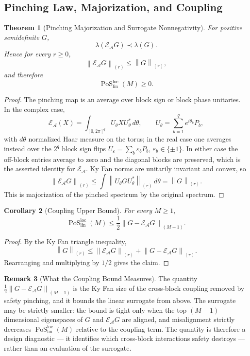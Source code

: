 \documentclass[12pt]{article}
\newtheorem{theorem}{Theorem}[section]
\newtheorem{corollary}[theorem]{Corollary}
\theoremstyle{definition}
\newtheorem{remark}[theorem]{Remark}
\DeclareMathOperator{\PoS}{PoS}
\newcommand{\EA}{\mathcal E_{\mathcal A}}
\newcommand{\KyF}[2]{\left\|#1\right\|_{(#2)}}
\newcommand{\PoSlin}{\PoS_{\mathrm{lin}}^{\mathrm{loc}}}
\begin{document}
\subsection{Pinching Law, Majorization, and Coupling}
\label{subsec:pos-pinching}

\begin{theorem}[Pinching Majorization and Surrogate Nonnegativity]
\label{thm:pinching}
For positive semidefinite $G$,
\[
\lambda(\EA G)\prec\lambda(G).
\]
Hence for every $r\ge0$,
\[
\KyF{\EA G}{r}
\le
\KyF{G}{r},
\]
and therefore
\[
\PoSlin(M)\ge0.
\]
\end{theorem}

\begin{proof}
The pinching map is an average over block sign or block phase unitaries.  In
the complex case,
\[
\EA(X)
=
\int_{[0,2\pi]^q}
U_\theta XU_\theta^{*}\,d\theta,
\qquad
U_\theta=\sum_{b=1}^q e^{i\theta_b}P_b,
\]
with $d\theta$ normalized Haar measure on the torus; in the real case one
averages instead over the $2^q$ block sign flips
$U_\varepsilon=\sum_b\varepsilon_bP_b$, $\varepsilon_b\in\{\pm1\}$.  In either
case the off-block entries average to zero and the diagonal blocks are
preserved, which is the asserted identity for $\EA$.  Ky Fan norms are
unitarily invariant and convex, so
\[
\KyF{\EA G}{r}
\le
\int
\KyF{U_\theta G U_\theta^*}{r}
\,d\theta
=
\KyF{G}{r}.
\]
This is majorization of the pinched spectrum by the original spectrum.
\end{proof}

\begin{corollary}[Coupling Upper Bound]
\label{cor:pos-coupling}
For every $M\ge1$,
\[
\PoSlin(M)
\le
\frac12
\KyF{G-\EA G}{M-1}.
\]
\end{corollary}

\begin{proof}
By the Ky Fan triangle inequality,
\[
\KyF{G}{r}
\le
\KyF{\EA G}{r}
+
\KyF{G-\EA G}{r}.
\]
Rearranging and multiplying by $1/2$ gives the claim.
\end{proof}

\begin{remark}[What the Coupling Bound Measures]
\label{rem:pos-coupling-design}
The quantity $\tfrac12\KyF{G-\EA G}{M-1}$ is the Ky Fan size of the
cross-block coupling removed by safety pinching, and it bounds the linear
surrogate from above.  The surrogate may be strictly smaller: the bound is
tight only when the top $(M-1)$-dimensional eigenspaces of $G$ and $\EA G$ are
aligned, and misalignment strictly decreases $\PoSlin(M)$ relative to the
coupling term.  The quantity is therefore a design diagnostic --- it identifies
which cross-block interactions safety destroys --- rather than an evaluation of
the surrogate.
\end{remark}
\end{document}
